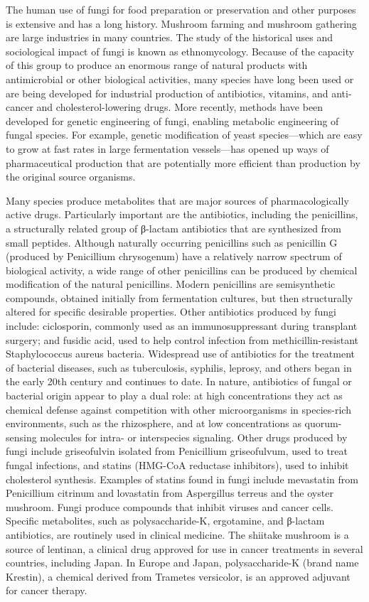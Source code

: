 The human use of fungi for food preparation or preservation and other purposes is extensive and has a long history. Mushroom farming and mushroom gathering are large industries in many countries. The study of the historical uses and sociological impact of fungi is known as ethnomycology. Because of the capacity of this group to produce an enormous range of natural products with antimicrobial or other biological activities, many species have long been used or are being developed for industrial production of antibiotics, vitamins, and anti-cancer and cholesterol-lowering drugs. More recently, methods have been developed for genetic engineering of fungi, enabling metabolic engineering of fungal species. For example, genetic modification of yeast species---which are easy to grow at fast rates in large fermentation vessels---has opened up ways of pharmaceutical production that are potentially more efficient than production by the original source organisms.

Many species produce metabolites that are major sources of pharmacologically active drugs. Particularly important are the antibiotics, including the penicillins, a structurally related group of β-lactam antibiotics that are synthesized from small peptides. Although naturally occurring penicillins such as penicillin G (produced by Penicillium chrysogenum) have a relatively narrow spectrum of biological activity, a wide range of other penicillins can be produced by chemical modification of the natural penicillins. Modern penicillins are semisynthetic compounds, obtained initially from fermentation cultures, but then structurally altered for specific desirable properties. Other antibiotics produced by fungi include: ciclosporin, commonly used as an immunosuppressant during transplant surgery; and fusidic acid, used to help control infection from methicillin-resistant Staphylococcus aureus bacteria. Widespread use of antibiotics for the treatment of bacterial diseases, such as tuberculosis, syphilis, leprosy, and others began in the early 20th century and continues to date. In nature, antibiotics of fungal or bacterial origin appear to play a dual role: at high concentrations they act as chemical defense against competition with other microorganisms in species-rich environments, such as the rhizosphere, and at low concentrations as quorum-sensing molecules for intra- or interspecies signaling. Other drugs produced by fungi include griseofulvin isolated from Penicillium griseofulvum, used to treat fungal infections, and statins (HMG-CoA reductase inhibitors), used to inhibit cholesterol synthesis. Examples of statins found in fungi include mevastatin from Penicillium citrinum and lovastatin from Aspergillus terreus and the oyster mushroom. Fungi produce compounds that inhibit viruses and cancer cells. Specific metabolites, such as polysaccharide-K, ergotamine, and β-lactam antibiotics, are routinely used in clinical medicine. The shiitake mushroom is a source of lentinan, a clinical drug approved for use in cancer treatments in several countries, including Japan. In Europe and Japan, polysaccharide-K (brand name Krestin), a chemical derived from Trametes versicolor, is an approved adjuvant for cancer therapy.


